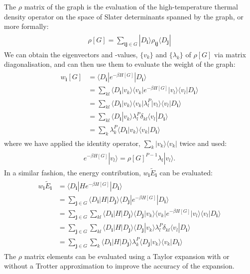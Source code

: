 \documentclass[openany,a4paper,10pt]{manual}
\newcommand{\bra}{\ensuremath{\langle}}
\newcommand{\ket}{\ensuremath{\rangle}}
\newcommand{\veci}{\ensuremath{\mathbf{i}}}
\newcommand{\vecj}{\ensuremath{\mathbf{j}}}
\begin{document}
The $\rho$  matrix of the graph is the evaluation of the
high-temperature thermal density operator on the space of Slater
determinants spanned by the graph, or more formally:
\begin{align}\begin{split}\rho[G] = \sum_{\veci\vecj \in G} |D_\veci \ket \rho_{\veci\vecj}\bra D_\vecj|\end{split}\end{align}
We can obtain the eigenvectors and -values, $\{v_k\}$ and
$\{\lambda_k\}$ of $\rho[G]$ via matrix diagonalisation, and can
then use them to evaluate the weight of the graph:
\begin{align}\begin{split}w_{\veci}[G] & = \bra D_{\veci} | e^{-\beta H[G]} | D_{\veci} \ket \\               & = \sum_{kl} \bra D_{\veci} | v_k \ket \bra v_k |  e^{-\beta H[G]} | v_l \ket \bra v_l | D_{\veci} \ket \\               & = \sum_{kl} \bra D_{\veci} | v_k \ket \bra v_k | \lambda_l^P | v_l \ket \bra v_l | D_{\veci} \ket \\              & = \sum_{kl} \bra D_{\veci} | v_k \ket \lambda_l^P \delta_{kl} \bra v_l | D_{\veci} \ket \\               & = \sum_k \lambda_k^P \bra D_{\veci} | v_k \ket \bra v_k | D_{\veci} \ket\end{split}\end{align}
where we have applied the identity operator, $\sum_k |v_k \ket \bra v_k |$ twice and used:
\begin{align}\begin{split}e^{-\beta H[G]} | v_l \ket = \rho[G]^{P-1} \lambda_l | v_l \ket.\end{split}\end{align}
In a similar fashion, the energy contribution, $w_{\veci}\tilde{E}_{\veci}$ can be evaluated:
\begin{align}\begin{split}w_{\veci}\tilde{E}_{\veci} & = \bra D_{\veci} | H e^{-\beta H[G]} | D_{\veci} \ket \\                            & = \sum_{\vecj \in G} \bra D_{\veci} | H | D_{\vecj} \ket \bra D_{\vecj} | e^{-\beta H[G]} | D_{\veci} \ket \\                            & = \sum_{\vecj \in G} \sum_{kl} \bra D_{\veci} | H | D_{\vecj} \ket \bra D_{\vecj} | v_k \ket \bra v_k |  e^{-\beta H[G]} | v_l \ket \bra v_l | D_{\veci} \ket \\                            & = \sum_{\vecj \in G} \sum_{kl}  \bra D_{\veci} | H | D_{\vecj} \ket \bra D_{\vecj} | v_k \ket \lambda_l^P \delta_{kl} \bra v_l | D_{\veci} \ket \\                            & = \sum_{\vecj \in G} \sum_{k} \bra D_{\veci} | H | D_{\vecj} \ket \lambda_k^P \bra D_{\vecj} | v_k \ket \bra v_k | D_{\veci} \ket\end{split}\end{align}
The $\rho$ matrix elements can be evaluated using a Taylor expansion
with or without a Trotter approximation to improve the accuracy of the expansion.
\end{document}
